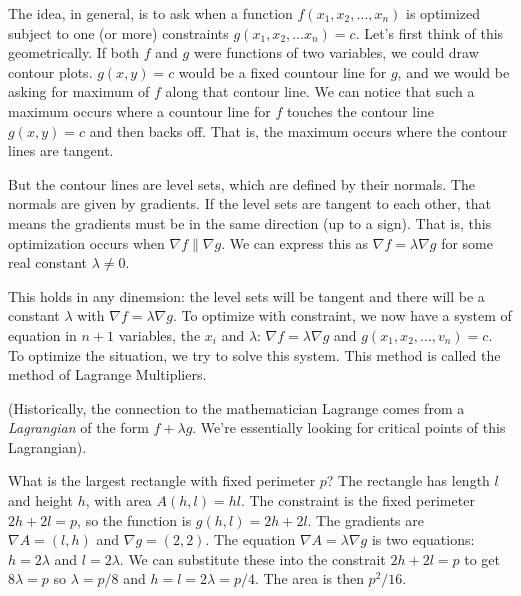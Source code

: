 \documentclass[fleqn,letterpaper]{report}
\begin{document}
The idea, in general, is to ask when a function $f(x_1, x_2,
\ldots, x_n)$ is optimized subject to one (or more)
constraints $g(x_1, x_2, \ldots x_n) = c$. Let's first think
of this geometrically. If both $f$ and $g$ were functions of
two variables, we could draw contour plots. $g(x,y) = c$
would be a fixed countour line for $g$, and we would be asking
for maximum of $f$ along that contour line. We can notice
that such a maximum occurs where a countour line for $f$
touches the contour line $g(x,y) = c$ and then backs off. That
is, the maximum occurs where the contour lines are tangent. 

But the contour lines are level sets, which are defined by
their normals. The normals are given by gradients. If the
level sets are tangent to each other, that means the gradients
must be in the same direction (up to a sign). That is, this
optimization occurs when $\nabla f \parallel \nabla g$. We can
express this as $\nabla f = \lambda \nabla g$ for some real
constant $\lambda \neq 0$.

This holds in any dinemsion: the level sets will be
tangent and there will be a constant $\lambda$ with $\nabla f
= \lambda \nabla g$. To optimize with constraint, we now have
a system of equation in $n+1$
variables, the $x_i$ and $\lambda$: $\nabla f = \lambda \nabla
g$ and $g(x_1, x_2, \ldots, v_n) = c$. To optimize the
situation, we try to solve this system. This method is called
the method of Lagrange Multipliers.

(Historically, the connection to the mathematician Lagrange
comes from a \emph{Lagrangian} of the form $f + \lambda g$.
We're essentially looking for critical points of this
Lagrangian).

\begin{example}
What is the largest rectangle with fixed perimeter $p$? The
rectangle has length $l$ and height $h$, with area $A(h,l) =
hl$. The constraint is the fixed perimeter $2h + 2l = p$, so
the function is $g(h,l) = 2h + 2l$. The gradients are $\nabla
A = (l,h)$ and $\nabla g = (2,2)$. The equation $\nabla A =
\lambda \nabla g$ is two equations: $h = 2\lambda$ and $l = 2
\lambda$. We can substitute these into the constrait $2h + 2l
= p$ to get $8 \lambda = p$ so $\lambda = p/8$ and $h = l = 2
\lambda = p/4$.  The area is then $p^2/16$.
\end{example}
\end{document}
